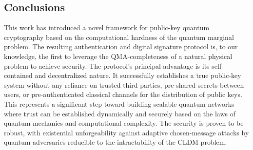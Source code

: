 \documentclass[a0,portrait]{a0poster}
\theoremstyle{definition}
\begin{document}
\begin{multicols}{2}
\section*{Conclusions}
This work has introduced a novel framework for public-key quantum cryptography based on the computational hardness of the quantum marginal problem. The resulting authentication and digital signature protocol is, to our knowledge, the first to leverage the QMA-completeness of a natural physical problem to achieve security. The protocol's principal advantage is its self-contained and decentralized nature. It successfully establishes a true public-key system-without any reliance on trusted third parties, pre-shared secrets between users, or pre-authenticated classical channels for the distribution of public keys. This represents a significant step toward building scalable quantum networks where trust can be established dynamically and securely based on the laws of quantum mechanics and computational complexity. The security is proven to be robust, with existential unforgeability against adaptive chosen-message attacks by quantum adversaries reducible to the intractability of the CLDM problem.


\nocite{*} %



\end{multicols}
\end{document}
